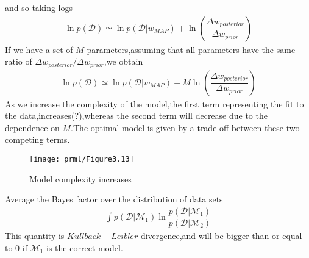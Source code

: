 and so taking logs
\begin{align}
\ln p(\mathcal{D}) \simeq \ln p(\mathcal{D}|w_{MAP}) +\ln(\dfrac{\Delta w_{posterior}}{\Delta w_{prior}})
\end{align}
If we have a set of $M$ parameters,assuming that all parameters have the same ratio of $\Delta w_{posterior}/\Delta w_{prior}$,we obtain
\begin{align}
\ln p(\mathcal{D}) \simeq \ln p(\mathcal{D}|w_{MAP}) +M\ln(\dfrac{\Delta w_{posterior}}{\Delta w_{prior}})
\end{align}
As we increase the complexity of the model,the first term representing the fit to the data,increases(?),whereas the second term will decrease due to the dependence on $M$.The optimal model is given by a trade-off between these two competing terms.
\begin{SCfigure*}
	\caption{Model complexity increases}
	\texttt{[image: prml/Figure3.13]}
\end{SCfigure*}
Average the Bayes factor over the distribution of data sets
\begin{align}
\int p(\mathcal{D}|\mathcal{M}_1)\ln\dfrac{p(\mathcal{D}|\mathcal{M}_1)}{p(\mathcal{D}|\mathcal{M}_2)}
\end{align}
This quantity is $Kullback-Leibler$ divergence,and will be bigger than or equal to $0$ if $\mathcal{M}_1$ is the correct model.








































